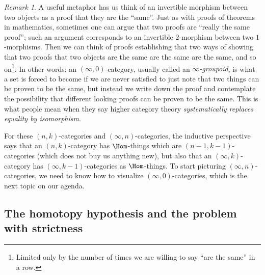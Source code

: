 \documentclass[12pt]{amsart}
\theoremstyle{definition} \newtheorem{definition}[theorem]{Definition}
\theoremstyle{remark} \newtheorem{remark}[theorem]{Remark}
\numberwithin{equation}{section}
\newcommand{\oo}{\infty}
\begin{document}
\begin{remark}\label{metaphor} A useful metaphor has us think of an
  invertible morphism between two objects as a proof that they are the
  ``same''. Just as with proofs of theorems in mathematics, sometimes
  one can argue that two proofs are ``really the same proof''; such an
  argument corresponds to an invertible $2$-morphism between two
  $1$-morphisms. Then we can think of proofs establishing that two
  ways of showing that two proofs that two objects are the same are
  the same are the same, and so on\footnote{Limited only by the number
    of times we are willing to say ``are the same'' in a row.}. In
  other words: an $(\oo,0)$-category, usually called an
  \emph{$\oo$-groupoid}, is what a set is forced to become if we are
  never satisfied to just note that two things can be proven to be the
  same, but instead we write down the proof and contemplate the
  possibility that different looking proofs can be proven to be the
  same. This is what people mean when they say higher category theory
  \emph{systematically replaces equality by isomorphism}.
\end{remark}

For these $(n,k)$-categories and $(\oo,n)$-categories, the inductive
perspective says that an $(n,k)$-category has $\Hom$-things which are
$(n-1,k-1)$-categories (which does not buy us anything new), but also
that an $(\oo,k)$-category has $(\oo,k-1)$-categories as
$\Hom$-things. To start picturing $(\oo,n)$-categories, we need to
know how to visualize $(\oo,0)$-categories, which is the next topic
on our agenda.

\subsection{The homotopy hypothesis and the problem with strictness}
\label{strict}
\end{document}
